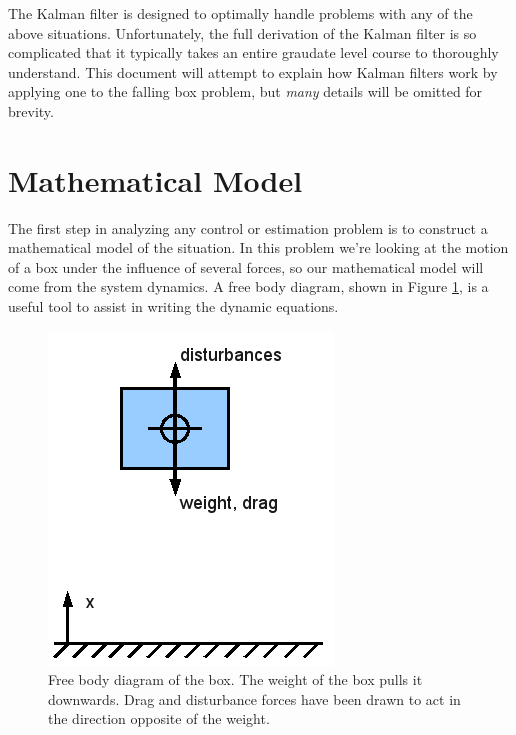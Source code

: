 \documentclass{article}
\begin{document}
The Kalman filter is designed to optimally handle problems with any of the above situations.  Unfortunately, the full derivation of the Kalman filter is so complicated that it typically takes an entire graudate level course to thoroughly understand.  This document will attempt to explain how Kalman filters work by applying one to the falling box problem, but \emph{many} details will be omitted for brevity.  


\section{Mathematical Model}
\label{sec:mathModel}

The first step in analyzing any control or estimation problem is to construct a mathematical model of the situation.  In this problem we're looking at the motion of a box under the influence of several forces, so our mathematical model will come from the system dynamics.  A free body diagram, shown in Figure \ref{fig:boxFreeBodyDiagram}, is a useful tool to assist in writing the dynamic equations.

\begin{figure}[h]
\includegraphics[scale=0.25]{boxFreeBodyDiagram.png}
\centering
\caption{Free body diagram of the box.  The weight of the box pulls it downwards.  Drag and disturbance forces have been drawn to act in the direction opposite of the weight. }
\label{fig:boxFreeBodyDiagram}
\end{figure}
\end{document}
